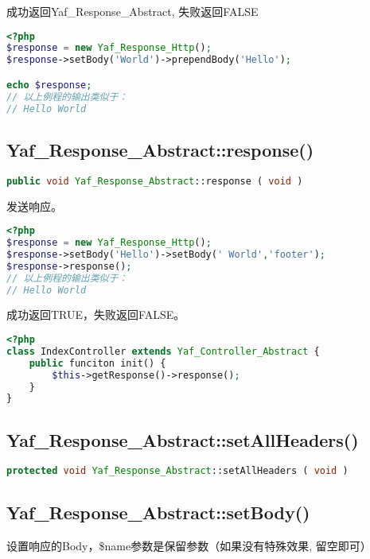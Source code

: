 成功返回Yaf\_Response\_Abstract, 失败返回FALSE

\begin{lstlisting}[language=PHP]
<?php
$response = new Yaf_Response_Http();
$response->setBody('World')->prependBody('Hello');

echo $response;
// 以上例程的输出类似于：
// Hello World
\end{lstlisting}

\subsection{Yaf\_Response\_Abstract::response()}

\begin{lstlisting}[language=PHP]
public void Yaf_Response_Abstract::response ( void )
\end{lstlisting}

发送响应。




\begin{lstlisting}[language=PHP]
<?php
$response = new Yaf_Response_Http();
$response->setBody('Hello')->setBody(' World','footer');
$response->response();
// 以上例程的输出类似于：
// Hello World
\end{lstlisting}

成功返回TRUE，失败返回FALSE。


\begin{lstlisting}[language=PHP]
<?php
class IndexController extends Yaf_Controller_Abstract {
    public funciton init() {
        $this->getResponse()->response();
    }
}
\end{lstlisting}

\subsection{Yaf\_Response\_Abstract::setAllHeaders()}





\begin{lstlisting}[language=PHP]
protected void Yaf_Response_Abstract::setAllHeaders ( void )
\end{lstlisting}


\subsection{Yaf\_Response\_Abstract::setBody()}

设置响应的Body，\$name参数是保留参数（如果没有特殊效果, 留空即可）



